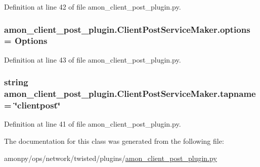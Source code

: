 Definition at line 42 of file amon\-\_\-client\-\_\-post\-\_\-plugin.\-py.

\hypertarget{classamon__client__post__plugin_1_1_client_post_service_maker_a24da49904f7a79f0d43139c68228d96d}{
\subsubsection[{options}]{\setlength{\rightskip}{0pt plus 5cm}amon\-\_\-client\-\_\-post\-\_\-plugin.\-Client\-Post\-Service\-Maker.\-options = {\bf Options}\hspace{0.3cm}{\ttfamily [static]}}}\label{classamon__client__post__plugin_1_1_client_post_service_maker_a24da49904f7a79f0d43139c68228d96d}


Definition at line 43 of file amon\-\_\-client\-\_\-post\-\_\-plugin.\-py.

\hypertarget{classamon__client__post__plugin_1_1_client_post_service_maker_ae6514d6e442e3e0855d2e474d3ec09a5}{
\subsubsection[{tapname}]{\setlength{\rightskip}{0pt plus 5cm}string amon\-\_\-client\-\_\-post\-\_\-plugin.\-Client\-Post\-Service\-Maker.\-tapname = \char`\"{}clientpost\char`\"{}\hspace{0.3cm}{\ttfamily [static]}}}\label{classamon__client__post__plugin_1_1_client_post_service_maker_ae6514d6e442e3e0855d2e474d3ec09a5}


Definition at line 41 of file amon\-\_\-client\-\_\-post\-\_\-plugin.\-py.



The documentation for this class was generated from the following file\-:\begin{DoxyCompactItemize}
\item 
amonpy/ops/network/twisted/plugins/\hyperlink{amon__client__post__plugin_8py}{amon\-\_\-client\-\_\-post\-\_\-plugin.\-py}\end{DoxyCompactItemize}
